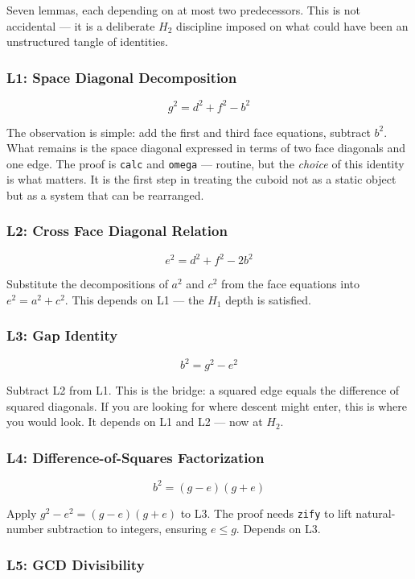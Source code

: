 \documentclass[12pt,a4paper]{article}
\begin{document}
Seven lemmas, each depending on at most two predecessors. This is not accidental --- it is a deliberate $H_2$ discipline imposed on what could have been an unstructured tangle of identities.

\subsubsection{L1: Space Diagonal Decomposition}

\[g^2 = d^2 + f^2 - b^2\]

The observation is simple: add the first and third face equations, subtract $b^2$. What remains is the space diagonal expressed in terms of two face diagonals and one edge. The proof is \texttt{calc} and \texttt{omega} --- routine, but the \emph{choice} of this identity is what matters. It is the first step in treating the cuboid not as a static object but as a system that can be rearranged.

\subsubsection{L2: Cross Face Diagonal Relation}

\[e^2 = d^2 + f^2 - 2b^2\]

Substitute the decompositions of $a^2$ and $c^2$ from the face equations into $e^2 = a^2 + c^2$. This depends on L1 --- the $H_1$ depth is satisfied.

\subsubsection{L3: Gap Identity}

\[b^2 = g^2 - e^2\]

Subtract L2 from L1. This is the bridge: a squared edge equals the difference of squared diagonals. If you are looking for where descent might enter, this is where you would look. It depends on L1 and L2 --- now at $H_2$.

\subsubsection{L4: Difference-of-Squares Factorization}

\[b^2 = (g - e)(g + e)\]

Apply $g^2 - e^2 = (g-e)(g+e)$ to L3. The proof needs \texttt{zify} to lift natural-number subtraction to integers, ensuring $e \leq g$. Depends on L3.

\subsubsection{L5: GCD Divisibility}
\end{document}
